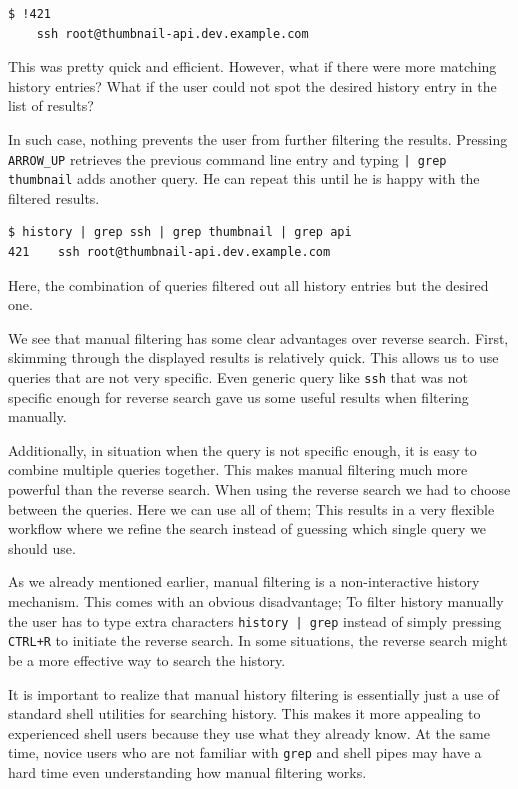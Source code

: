 \documentclass[thesis=M,english]{FITthesis}[2012/10/20]
\begin{document}
\begin{verbatim}
$ !421
    ssh root@thumbnail-api.dev.example.com
\end{verbatim}

This was pretty quick and efficient. However, what if there were more matching history entries? What if the user could not spot the desired history entry in the list of results?

In such case, nothing prevents the user from further filtering the results. Pressing  \verb|ARROW_UP| retrieves the previous command line entry and typing \verb#| grep thumbnail# adds another query. He can repeat this until he is happy with the filtered results.

\begin{verbatim}
$ history | grep ssh | grep thumbnail | grep api
421    ssh root@thumbnail-api.dev.example.com
\end{verbatim}

Here, the combination of queries filtered out all history entries but the desired one.

We see that manual filtering has some clear advantages over reverse search.
First, skimming through the displayed results is relatively quick. This allows us to use queries that are not very specific.
Even generic query like \verb|ssh| that was not specific enough for reverse search gave us some useful results when filtering manually.

Additionally, in situation when the query is not specific enough, it is easy to combine multiple queries together. This makes manual filtering much more powerful than the reverse search. 
When using the reverse search we had to choose between the queries. Here we can use all of them; This results in a very flexible workflow where we refine the search instead of guessing which single query we should use.


As we already mentioned earlier, manual filtering is a non-interactive history mechanism. This comes with an obvious disadvantage; To filter history manually the user has to type extra characters \verb#history | grep# instead of simply pressing \verb|CTRL+R| to initiate the reverse search. In some situations, the reverse search might be a more effective way to search the history.

It is important to realize that manual history filtering is essentially just a use of standard shell utilities for searching history.
This makes it more appealing to experienced shell users because they use what they already know. At the same time, novice users who are not familiar with \verb|grep| and shell pipes may have a hard time even understanding how manual filtering works. 
\end{document}
